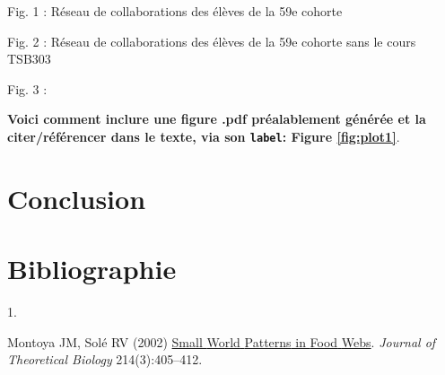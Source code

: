 \documentclass[9pt,twocolumn,twoside,]{pnas-new}
\newlength{\cslhangindent}
\newlength{\csllabelwidth}
\newlength{\cslentryspacingunit} %
\newenvironment{CSLReferences}[2] %
 {%
  \setlength{\parindent}{0pt}
  \ifodd #1
  \let\oldpar\par
  \def\par{\hangindent=\cslhangindent\oldpar}
  \fi
  \setlength{\parskip}{#2\cslentryspacingunit}
 }%
 {}
\newcommand{\CSLLeftMargin}[1]{\parbox[t]{\csllabelwidth}{#1}}
\newcommand{\CSLRightInline}[1]{\parbox[t]{\linewidth - \csllabelwidth}{#1}\break}
\begin{document}
Fig. 1 : Réseau de collaborations des élèves de la 59e cohorte

Fig. 2 : Réseau de collaborations des élèves de la 59e cohorte sans le
cours TSB303

Fig. 3 :

\textbf{Voici comment inclure une figure .pdf préalablement générée et
la citer/référencer dans le texte, via son \texttt{label}: Figure
\ref{fig:plot1}}.

\hypertarget{conclusion}{%
\section{Conclusion}\label{conclusion}}

\newpage

\hypertarget{bibliographie}{%
\section*{Bibliographie}\label{bibliographie}}

\hypertarget{refs}{}
\begin{CSLReferences}{0}{0}
\leavevmode{}%
\CSLLeftMargin{1. }
\CSLRightInline{Montoya JM, Solé RV (2002)
\href{https://doi.org/10.1006/jtbi.2001.2460}{Small {World} {Patterns}
in {Food} {Webs}}. \emph{Journal of Theoretical Biology}
214(3):405--412.}

\end{CSLReferences}



% 
\end{document}
